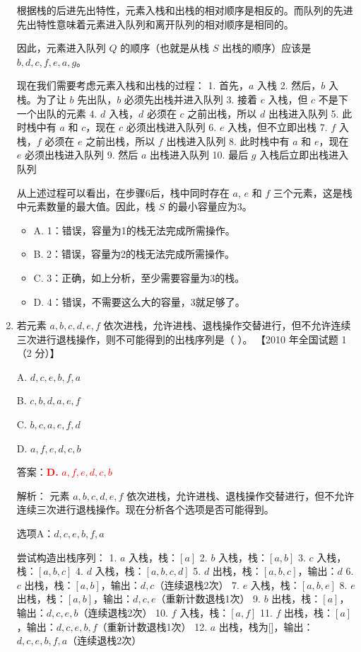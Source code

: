 \documentclass[lang=cn,newtx,10pt,scheme=chinese]{../../../elegantbook}
\begin{document}
\begin{enumerate}
    根据栈的后进先出特性，元素入栈和出栈的相对顺序是相反的。而队列的先进先出特性意味着元素进入队列和离开队列的相对顺序是相同的。
    
    因此，元素进入队列 $Q$ 的顺序（也就是从栈 $S$ 出栈的顺序）应该是 $b, d, c, f, e, a, g$。

    现在我们需要考虑元素入栈和出栈的过程：
    1. 首先，$a$ 入栈
    2. 然后，$b$ 入栈。为了让 $b$ 先出队，$b$ 必须先出栈并进入队列
    3. 接着 $c$ 入栈，但 $c$ 不是下一个出队的元素
    4. $d$ 入栈，$d$ 必须在 $c$ 之前出栈，所以 $d$ 出栈进入队列
    5. 此时栈中有 $a$ 和 $c$，现在 $c$ 必须出栈进入队列
    6. $e$ 入栈，但不立即出栈
    7. $f$ 入栈，$f$ 必须在 $e$ 之前出栈，所以 $f$ 出栈进入队列
    8. 此时栈中有 $a$ 和 $e$，现在 $e$ 必须出栈进入队列
    9. 然后 $a$ 出栈进入队列
    10. 最后 $g$ 入栈后立即出栈进入队列
    
    从上述过程可以看出，在步骤6后，栈中同时存在 $a$, $e$ 和 $f$ 三个元素，这是栈中元素数量的最大值。因此，栈 $S$ 的最小容量应为3。

    \begin{itemize}
        \item A. 1：错误，容量为1的栈无法完成所需操作。
        \item B. 2：错误，容量为2的栈无法完成所需操作。
        \item C. 3：正确，如上分析，至少需要容量为3的栈。
        \item D. 4：错误，不需要这么大的容量，3就足够了。
    \end{itemize}

    \item 若元素 $a, b, c, d, e,f$ 依次进栈，允许进栈、退栈操作交替进行，但不允许连续三次进行退栈操作，则不可能得到的出栈序列是（ ）。  
    【2010 年全国试题 1（2 分）】  

    A. $d, c, e, b,f, a$  

    B. $c, b, d, a, e,f$  

    C. $b,c, a, e,f, d $  

    D. $a,f,e,d,c,b$  

    答案：\textcolor{red}{\textbf{D.} $a,f,e,d,c,b$}

    解析：
    元素 $a, b, c, d, e, f$ 依次进栈，允许进栈、退栈操作交替进行，但不允许连续三次进行退栈操作。现在分析各个选项是否可能得到。

    选项A：$d, c, e, b, f, a$
    
    尝试构造出栈序列：
    1. $a$ 入栈，栈：$[a]$
    2. $b$ 入栈，栈：$[a, b]$
    3. $c$ 入栈，栈：$[a, b, c]$
    4. $d$ 入栈，栈：$[a, b, c, d]$
    5. $d$ 出栈，栈：$[a, b, c]$，输出：$d$
    6. $c$ 出栈，栈：$[a, b]$，输出：$d, c$（连续退栈2次）
    7. $e$ 入栈，栈：$[a, b, e]$
    8. $e$ 出栈，栈：$[a, b]$，输出：$d, c, e$（重新计数退栈1次）
    9. $b$ 出栈，栈：$[a]$，输出：$d, c, e, b$（连续退栈2次）
    10. $f$ 入栈，栈：$[a, f]$
    11. $f$ 出栈，栈：$[a]$，输出：$d, c, e, b, f$（重新计数退栈1次）
    12. $a$ 出栈，栈为[]，输出：$d, c, e, b, f, a$（连续退栈2次）
    

\end{enumerate}
\end{document}
